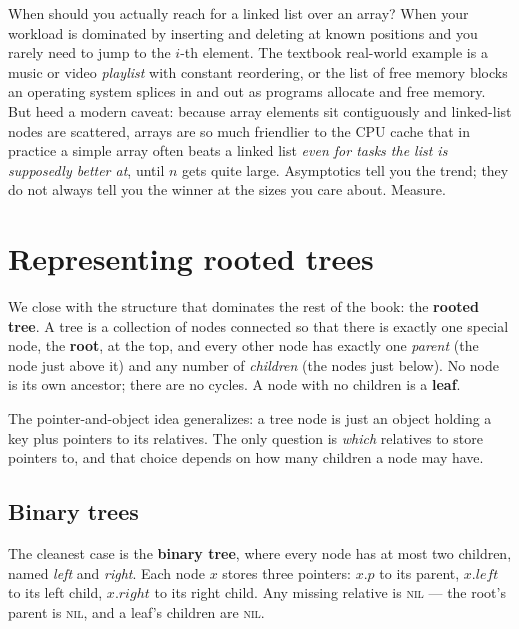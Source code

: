 \begin{aestheticbox}
When should you actually reach for a linked list over an array? When your workload is dominated by inserting and deleting at known positions and you rarely need to jump to the $i$-th element. The textbook real-world example is a music or video \emph{playlist} with constant reordering, or the list of free memory blocks an operating system splices in and out as programs allocate and free memory. But heed a modern caveat: because array elements sit contiguously and linked-list nodes are scattered, arrays are so much friendlier to the CPU cache that in practice a simple array often beats a linked list \emph{even for tasks the list is supposedly better at}, until $n$ gets quite large. Asymptotics tell you the trend; they do not always tell you the winner at the sizes you care about. Measure.
\end{aestheticbox}

\section{Representing rooted trees}
\label{ch10:trees}

We close with the structure that dominates the rest of the book: the \textbf{rooted tree}. A tree is a collection of nodes connected so that there is exactly one special node, the \textbf{root}, at the top, and every other node has exactly one \emph{parent} (the node just above it) and any number of \emph{children} (the nodes just below). No node is its own ancestor; there are no cycles. A node with no children is a \textbf{leaf}.

The pointer-and-object idea generalizes: a tree node is just an object holding a key plus pointers to its relatives. The only question is \emph{which} relatives to store pointers to, and that choice depends on how many children a node may have.

\subsection{Binary trees}

The cleanest case is the \textbf{binary tree}, where every node has at most two children, named \emph{left} and \emph{right}. Each node $x$ stores three pointers: $x.p$ to its parent, $x.left$ to its left child, $x.right$ to its right child. Any missing relative is \textsc{nil} --- the root's parent is \textsc{nil}, and a leaf's children are \textsc{nil}.

